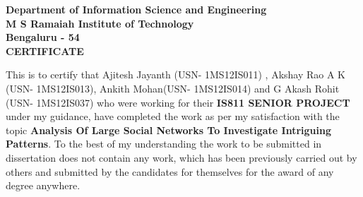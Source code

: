 \begin{center}
\thispagestyle{empty}
\bfseries
\large{Department of Information Science and Engineering \\
M S Ramaiah Institute of Technology \\
Bengaluru - 54} \\
{ }
\LARGE{CERTIFICATE} \\
\end{center}
\vspace{0.1in}
\large{
This is to certify that Ajitesh Jayanth (USN- 1MS12IS011) , Akshay Rao A K (USN- 1MS12IS013), Ankith Mohan(USN- 1MS12IS014) and G Akash Rohit (USN- 1MS12IS037) who were working for their \textbf{IS811 SENIOR PROJECT} under my guidance, have completed the work as per my satisfaction with the topic \textbf{Analysis Of Large Social Networks To Investigate Intriguing Patterns}. To the best of my understanding the work to be submitted in dissertation does not contain any work, which has been previously carried out by others and submitted by the candidates for themselves for the award of any degree anywhere.
} \\
